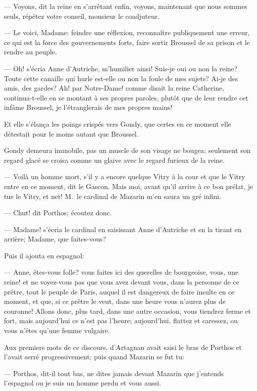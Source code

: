 — Voyons, dit la reine en s'arrêtant enfin, voyons, maintenant que nous sommes seuls, répétez votre conseil, monsieur le coadjuteur.

— Le voici, Madame: feindre une réflexion, reconnaître publiquement une erreur, ce qui est la force des gouvernements forts, faire sortir Broussel de sa prison et le rendre au peuple.

— Oh! s'écria Anne d'Autriche, m'humilier ainsi! Suis-je oui ou non la reine? Toute cette canaille qui hurle est-elle ou non la foule de mes sujets? Ai-je des amis, des gardes? Ah! par Notre-Dame! comme disait la reine Catherine, continua-t-elle en se montant à ses propres paroles, plutôt que de leur rendre cet infâme Broussel, je l'étranglerais de mes propres mains!

Et elle s'élança les poings crispés vers Gondy, que certes en ce moment elle détestait pour le moins autant que Broussel.

Gondy demeura immobile, pas un muscle de son visage ne bougea; seulement son regard glacé se croisa comme un glaive avec le regard furieux de la reine.

— Voilà un homme mort, s'il y a encore quelque Vitry à la cour et que le Vitry entre en ce moment, dit le Gascon. Mais moi, avant qu'il arrive à ce bon prélat, je tue le Vitry, et net! M.~le cardinal de Mazarin m'en saura un gré infini.

— Chut! dit Porthos; écoutez donc.

— Madame! s'écria le cardinal en saisissant Anne d'Autriche et en la tirant en arrière; Madame, que faites-vous?

Puis il ajouta en espagnol:

— Anne, êtes-vous folle? vous faites ici des querelles de bourgeoise, vous, une reine! et ne voyez-vous pas que vous avez devant vous, dans la personne de ce prêtre, tout le peuple de Paris, auquel il est dangereux de faire insulte en ce moment, et que, si ce prêtre le veut, dans une heure vous n'aurez plus de couronne! Allons donc, plus tard, dans une autre occasion, vous tiendrez ferme et fort, mais aujourd'hui ce n'est pas l'heure; aujourd'hui, flattez et caressez, ou vous n'êtes qu'une femme vulgaire.

Aux premiers mots de ce discours, d'Artagnan avait saisi le bras de Porthos et l'avait serré progressivement; puis quand Mazarin se fut tu:

— Porthos, dit-il tout bas, ne dites jamais devant Mazarin que j'entends l'espagnol ou je suis un homme perdu et vous aussi.

